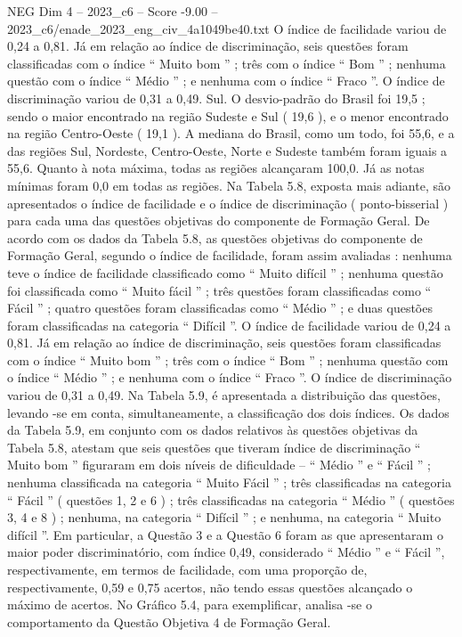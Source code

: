 \begin{textsample}{NEG Dim 4 – 2023\_c6 – Score -9.00 – 2023\_c6/enade\_2023\_eng\_civ\_4a1049be40.txt}
O índice de facilidade variou de 0,24 a 0,81.
Já em relação ao índice de discriminação, seis questões foram classificadas com o índice “ Muito bom ” ; três com o índice “ Bom ” ; nenhuma questão com o índice “ Médio ” ; e nenhuma com o índice “ Fraco ”.
O índice de discriminação variou de 0,31 a 0,49.
Sul.
O desvio-padrão do Brasil foi 19,5 ; sendo o maior encontrado na região Sudeste e Sul ( 19,6 ), e o menor encontrado na região Centro-Oeste ( 19,1 ).
A mediana do Brasil, como um todo, foi 55,6, e a das regiões Sul, Nordeste, Centro-Oeste, Norte e Sudeste também foram iguais a 55,6.
Quanto à nota máxima, todas as regiões alcançaram 100,0.
Já as notas mínimas foram 0,0 em todas as regiões.
Na Tabela 5.8, exposta mais adiante, são apresentados o índice de facilidade e o índice de discriminação ( ponto-bisserial ) para cada uma das questões objetivas do componente de Formação Geral.
De acordo com os dados da Tabela 5.8, as questões objetivas do componente de Formação Geral, segundo o índice de facilidade, foram assim avaliadas : nenhuma teve o índice de facilidade classificado como “ Muito difícil ” ; nenhuma questão foi classificada como “ Muito fácil ” ; três questões foram classificadas como “ Fácil ” ; quatro questões foram classificadas como “ Médio ” ; e duas questões foram classificadas na categoria “ Difícil ”.
O índice de facilidade variou de 0,24 a 0,81.
Já em relação ao índice de discriminação, seis questões foram classificadas com o índice “ Muito bom ” ; três com o índice “ Bom ” ; nenhuma questão com o índice “ Médio ” ; e nenhuma com o índice “ Fraco ”.
O índice de discriminação variou de 0,31 a 0,49.
Na Tabela 5.9, é apresentada a distribuição das questões, levando -se em conta, simultaneamente, a classificação dos dois índices.
Os dados da Tabela 5.9, em conjunto com os dados relativos às questões objetivas da Tabela 5.8, atestam que seis questões que tiveram índice de discriminação “ Muito bom ” figuraram em dois níveis de dificuldade – “ Médio ” e “ Fácil ” ; nenhuma classificada na categoria “ Muito Fácil ” ; três classificadas na categoria “ Fácil ” ( questões 1, 2 e 6 ) ; três classificadas na categoria “ Médio ” ( questões 3, 4 e 8 ) ; nenhuma, na categoria “ Difícil ” ; e nenhuma, na categoria “ Muito difícil ”.
Em particular, a Questão 3 e a Questão 6 foram as que apresentaram o maior poder discriminatório, com índice 0,49, considerado “ Médio ” e “ Fácil ”, respectivamente, em termos de facilidade, com uma proporção de, respectivamente, 0,59 e 0,75 acertos, não tendo essas questões alcançado o máximo de acertos.
No Gráfico 5.4, para exemplificar, analisa -se o comportamento da Questão Objetiva 4 de Formação Geral.

\end{textsample}
